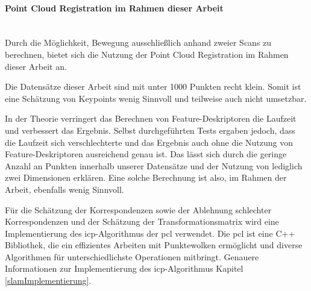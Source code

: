 \paragraph{Point Cloud Registration im Rahmen dieser Arbeit} \mbox{}\\
Durch die Möglichkeit, Bewegung ausschließlich anhand zweier Scans zu berechnen, 
bietet sich die Nutzung der Point Cloud Registration im Rahmen dieser Arbeit an.

Die Datensätze dieser Arbeit sind mit unter 1000 Punkten recht klein.
Somit ist eine Schätzung von Keypoints wenig Sinnvoll und teilweise auch nicht umsetzbar.

In der Theorie verringert das Berechnen von Feature-Deskriptoren die Laufzeit und verbessert das Ergebnis.
Selbst durchgeführten Tests ergaben jedoch, dass die Laufzeit sich verschlechterte 
und das Ergebnis auch ohne die Nutzung von Feature-Deskriptoren ausreichend genau ist.
Das lässt sich durch die geringe Anzahl an Punkten innerhalb unserer Datensätze und der Nutzung von lediglich zwei Dimensionen erklären.
Eine solche Berechnung ist also, im Rahmen der Arbeit, ebenfalls wenig Sinnvoll.

Für die Schätzung der Korrespondenzen sowie der Ablehnung schlechter Korrespondenzen 
und der Schätzung der Transformationsmatrix wird eine Implementierung des \ac{icp}-Algorithmus der \acf{pcl} verwendet.
Die \ac{pcl} ist eine C++ Bibliothek, die ein effizientes Arbeiten mit Punktewolken ermöglicht
und diverse Algorithmen für unterschiedlichste Operationen mitbringt.
Genauere Informationen zur Implementierung des \ac{icp}-Algorithmus Kapitel \ref{slamImplementierung}.

\newpage
